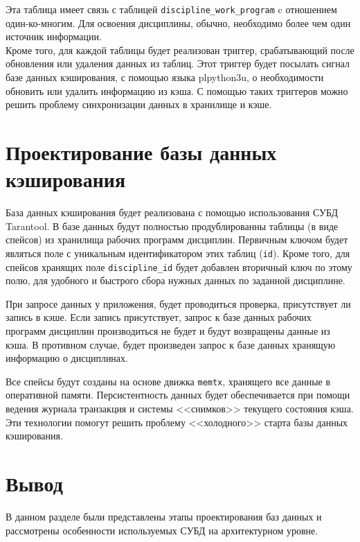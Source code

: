 Эта таблица имеет связь с таблицей \texttt{discipline\_work\_program} c отношением один-ко-многим. Для освоения дисциплины, обычно, необходимо более чем один источник информации.\\

Кроме того, для каждой таблицы будет реализован триггер, срабатывающий после обновления или удаления данных из таблиц. Этот триггер будет посылать сигнал базе данных кэширования, с помощью языка plpython3u, о необходимости обновить или удалить информацию из кэша. С помощью таких триггеров можно решить проблему синхронизации данных в хранилище и кэше.

\section{Проектирование базы данных кэширования}

База данных кэширования будет реализована с помощью использования СУБД Tarantool. В базе данных будут полностью продублированны таблицы (в виде спейсов) из хранилища рабочих программ дисциплин. Первичным ключом будет являться поле с уникальным идентификатором этих таблиц (\texttt{id}). Кроме того, для спейсов хранящих поле \texttt{discipline\_id} будет добавлен вторичный ключ по этому полю, для удобного и быстрого сбора нужных данных по заданной дисциплине.

При запросе данных у приложения, будет проводиться проверка, присутствует ли запись в кэше. Если запись присутствует, запрос к базе данных рабочих программ дисциплин производиться не будет и будут возвращены данные из кэша. В противном случае, будет произведен запрос к базе данных хранящую информацию о дисциплинах.

Все спейсы будут созданы на основе движка \texttt{memtx}, хранящего все данные в оперативной памяти. Персистентность данных будет обеспечивается при помощи ведения журнала транзакция и системы <<снимков>> текущего состояния кэша. Эти технологии помогут решить проблему <<холодного>> старта базы данных кэширования.

\section*{Вывод}

В данном разделе были представлены этапы проектирования баз данных и рассмотрены особенности используемых СУБД на архитектурном уровне.
